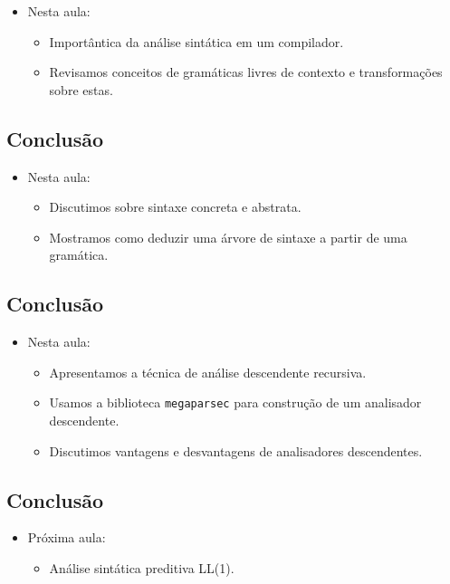 \documentclass[11pt]{article}
\begin{document}
\begin{itemize}
\item Nesta aula:
\begin{itemize}
\item Importântica da análise sintática em um compilador.
\item Revisamos conceitos de gramáticas livres de contexto e transformações sobre estas.
\end{itemize}
\end{itemize}
\subsection*{Conclusão}
\label{sec:org5eb49da}

\begin{itemize}
\item Nesta aula:
\begin{itemize}
\item Discutimos sobre sintaxe concreta e abstrata.
\item Mostramos como deduzir uma árvore de sintaxe a partir de uma gramática.
\end{itemize}
\end{itemize}
\subsection*{Conclusão}
\label{sec:org6f6d473}

\begin{itemize}
\item Nesta aula:
\begin{itemize}
\item Apresentamos a técnica de análise descendente recursiva.
\item Usamos a biblioteca \texttt{megaparsec} para construção de um analisador descendente.
\item Discutimos vantagens e desvantagens de analisadores descendentes.
\end{itemize}
\end{itemize}
\subsection*{Conclusão}
\label{sec:orgd7cf339}

\begin{itemize}
\item Próxima aula:

\begin{itemize}
\item Análise sintática preditiva LL(1).
\end{itemize}
\end{itemize}
\end{document}
